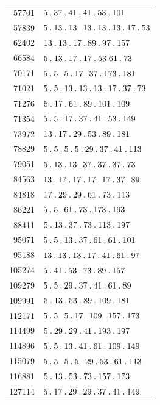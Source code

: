 \begin{longtable}{@{}r|l@{}}
57701 & $5\pdot 37\pdot 41\pdot 41\pdot 53\pdot 101$\\
57839 & $5\pdot 13\pdot 13\pdot 13\pdot 13\pdot 13\pdot 17\pdot 53$\\
62402 & $13\pdot 13\pdot 17\pdot 89\pdot 97\pdot 157$\\
66584 & $5\pdot 13\pdot 17\pdot 17\pdot 53\;61\pdot 73$\\
70171 & $5\pdot 5\pdot 5\pdot 17\pdot 37\pdot 173\pdot 181$\\
71021 & $5\pdot 5\pdot 13\pdot 13\pdot 13\pdot 17\pdot 37\pdot 73$\\
71276 & $5\pdot 17\pdot 61\pdot 89\pdot 101\pdot 109$\\
71354 & $5\pdot 5\pdot 17\pdot 37\pdot 41\pdot 53\pdot 149$\\
73972 & $13\pdot 17\pdot 29\pdot 53\pdot 89\pdot 181$\\
78829 & $5\pdot 5\pdot 5\pdot 5\pdot 29\pdot 37\pdot 41\pdot 113$\\
79051 & $5\pdot 13\pdot 13\pdot 37\pdot 37\pdot 37\pdot 73$\\
84563 & $13\pdot 17\pdot 17\pdot 17\pdot 17\pdot 37\pdot 89$\\
84818 & $17\pdot 29\pdot 29\pdot 61\pdot 73\pdot 113$\\
86221 & $5\pdot 5\pdot 61\pdot 73\pdot 173\pdot 193$\\
88411 & $5\pdot 13\pdot 37\pdot 73\pdot 113\pdot 197$\\
95071 & $5\pdot 5\pdot 13\pdot 37\pdot 61\pdot 61\pdot 101$\\
95188 & $13\pdot 13\pdot 13\pdot 17\pdot 41\pdot 61\pdot 97$\\
105274 & $5\pdot 41\pdot 53\pdot 73\pdot 89\pdot 157$\\
109279 & $5\pdot 5\pdot 29\pdot 37\pdot 41\pdot 61\pdot 89$\\
109991 & $5\pdot 13\pdot 53\pdot 89\pdot 109\pdot 181$\\
112171 & $5\pdot 5\pdot 5\pdot 17\pdot 109\pdot 157\pdot 173$\\
114499 & $5\pdot 29\pdot 29\pdot 41\pdot 193\pdot 197$\\
114896 & $5\pdot 5\pdot 13\pdot 41\pdot 61\pdot 109\pdot 149$\\
115079 & $5\pdot 5\pdot 5\pdot 5\pdot 29\pdot 53\pdot 61\pdot 113$\\
116881 & $5\pdot 13\pdot 53\pdot 73\pdot 157\pdot 173$\\
127114 & $5\pdot 17\pdot 29\pdot 29\pdot 37\pdot 41\pdot 149$\\

\end{longtable}
